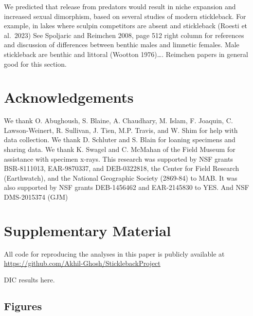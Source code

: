 \documentclass[
  12pt,
]{article}
\begin{document}
We predicted that release from predators would result in niche expansion
and increased sexual dimorphism, based on several studies of modern
stickleback. For example, in lakes where sculpin competitors are absent
and stickleback (Roesti et al.~2023) See Spoljaric and Reimchen 2008,
page 512 right column for references and discussion of differences
between benthic males and limnetic females. Male stickleback are benthic
and littoral (Wootton 1976)\ldots. Reimchen papers in general good for
this section.

\hypertarget{acknowledgements}{%
\section*{Acknowledgements}\label{acknowledgements}}

We thank O. Abughoush, S. Blaine, A. Chaudhary, M. Islam, F. Joaquin, C.
Lawson-Weinert, R. Sullivan, J. Tien, M.P. Travis, and W. Shim for help
with data collection. We thank D. Schluter and S. Blain for loaning
specimens and sharing data. We thank K. Swagel and C. McMahan of the
Field Museum for assistance with specimen x-rays. This research was
supported by NSF grants BSR-8111013, EAR-9870337, and DEB-0322818, the
Center for Field Research (Earthwatch), and the National Geographic
Society (2869-84) to MAB. It was also supported by NSF grants
DEB-1456462 and EAR-2145830 to YES. And NSF DMS-2015374 (GJM)

\hypertarget{supplementary-material}{%
\section*{Supplementary Material}\label{supplementary-material}}

All code for reproducing the analyses in this paper is publicly
available at \url{https://github.com/Akhil-Ghosh/SticklebackProject}

DIC results here.

\hypertarget{figures}{%
\subsection{Figures}\label{figures}}
\end{document}
